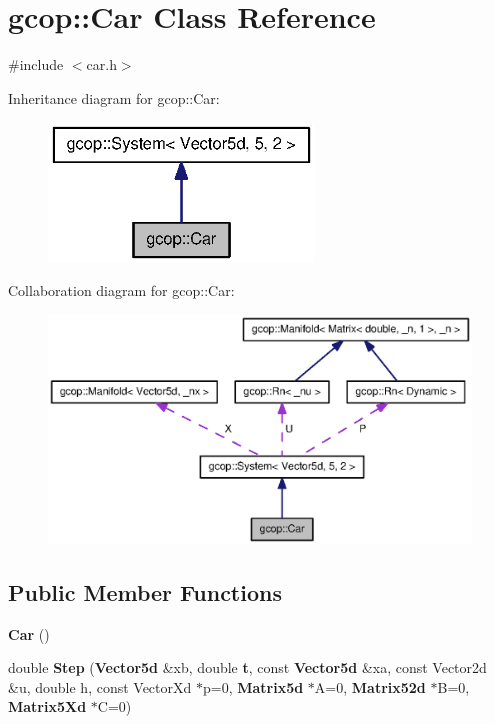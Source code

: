 \section{gcop\-:\-:\-Car \-Class \-Reference}
\label{classgcop_1_1Car}


{\ttfamily \#include $<$car.\-h$>$}



\-Inheritance diagram for gcop\-:\-:\-Car\-:
\nopagebreak
\begin{figure}[H]
\begin{center}
\leavevmode
\includegraphics[width=200pt]{classgcop_1_1Car__inherit__graph}
\end{center}
\end{figure}


\-Collaboration diagram for gcop\-:\-:\-Car\-:
\nopagebreak
\begin{figure}[H]
\begin{center}
\leavevmode
\includegraphics[width=350pt]{classgcop_1_1Car__coll__graph}
\end{center}
\end{figure}
\subsection*{\-Public \-Member \-Functions}
\begin{DoxyCompactItemize}
\item 
{\bf \-Car} ()
\item 
double {\bf \-Step} ({\bf \-Vector5d} \&xb, double {\bf t}, const {\bf \-Vector5d} \&xa, const \-Vector2d \&u, double h, const \-Vector\-Xd $\ast$p=0, {\bf \-Matrix5d} $\ast$\-A=0, {\bf \-Matrix52d} $\ast$\-B=0, {\bf \-Matrix5\-Xd} $\ast$\-C=0)
\end{DoxyCompactItemize}
